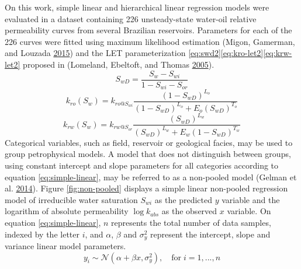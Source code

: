 \documentclass[english,msc,numbers]{coppe}
\begin{document}
  On this work, simple linear and hierarchical linear regression models were evaluated in a dataset containing 226 unsteady-state water-oil relative permeability curves from several Brazilian reservoirs. Parameters for each of the 226 curves were fitted using maximum likelihood estimation (Migon, Gamerman, and Louzada \protect\hyperlink{ref-Migon2015}{2015}) and the LET parameterization \eqref{eq:swd2}\eqref{eq:kro-let2}\eqref{eq:krw-let2} proposed in (Lomeland, Ebeltoft, and Thomas \protect\hyperlink{ref-Lomeland2005}{2005}).
  \begin{equation} 
    S_{wD} = \frac{S_w - S_{wi}}{1 - S_{wi} - S_{or}} 
    \label{eq:swd2}
  \end{equation}
  \begin{equation} 
    k_{ro}(S_w) = k_{ro@S_{wi}}\frac{(1-S_{wD})^{L_o}}{(1-S_{wD})^{L_o} + E_o(S_{wD})^{T_o}}
    \label{eq:kro-let2}
  \end{equation}
  \begin{equation} 
    k_{rw}(S_w) = k_{rw@S_{or}}\frac{(S_{wD})^{L_w}}{(S_{wD})^{L_w} + E_w(1-S_{wD})^{T_w}}
    \label{eq:krw-let2}
  \end{equation}
  Categorical variables, such as field, reservoir or geological facies, may be used to group petrophysical models. A model that does not distinguish between groups, using constant intercept and slope parameters for all categories according to equation \eqref{eq:simple-linear}, may be referred to as a non-pooled model (Gelman et al. \protect\hyperlink{ref-Gelman2014}{2014}). Figure \ref{fig:non-pooled} displays a simple linear non-pooled regression model of irreducible water saturation \(S_{wi}\) as the predicted \(y\) variable and the logarithm of absolute permeability \(\log{k_{abs}}\) as the observed \(x\) variable. On equation \eqref{eq:simple-linear}, \(n\) represents the total number of data samples, indexed by the letter \(i\), and \(\alpha\), \(\beta\) and \(\sigma_y^2\) represent the intercept, slope and variance linear model parameters.
  \begin{equation} 
    y_i \sim \mathcal{N}(\alpha + \beta x, \sigma_y^2),\quad \text{for}\; i=1,...,n
    \label{eq:simple-linear}
  \end{equation}
\end{document}
